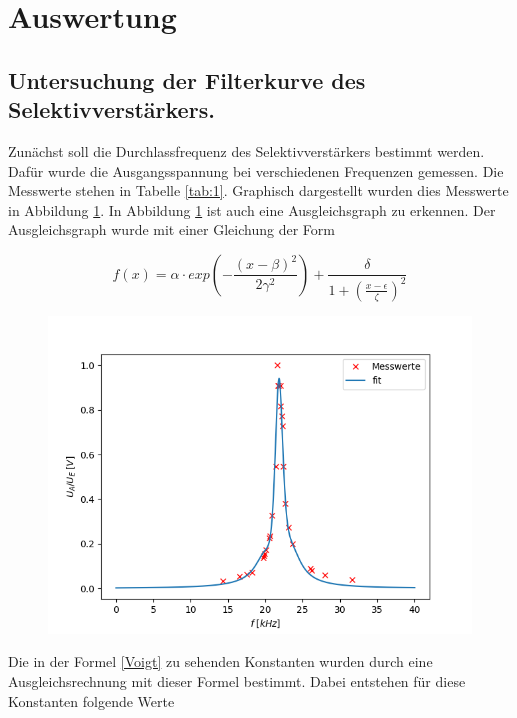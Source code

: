 \section{Auswertung}

\subsection{Untersuchung der Filterkurve des Selektivverstärkers.}

Zunächst soll die Durchlassfrequenz des Selektivverstärkers bestimmt werden. Dafür wurde die Ausgangsspannung bei verschiedenen Frequenzen gemessen. Die Messwerte stehen in Tabelle \ref{tab:1}. Graphisch dargestellt wurden dies Messwerte in Abbildung \ref{fig:durchlass}. In Abbildung \ref{fig:durchlass} ist auch eine Ausgleichsgraph zu erkennen. Der Ausgleichsgraph wurde mit einer Gleichung der Form

\begin{equation} \label{Voigt}
    f(x) = \alpha \cdot exp \left( - \frac{(x-\beta)^2}{2\gamma^2} \right) + \frac{\delta}{1+\left(\frac{x-\epsilon}{\zeta}\right)^2}
\end{equation}

\begin{figure}
    \centering
    \includegraphics{durchlass.png}
    \label{fig:durchlass}
\end{figure}

\noindent Die in der Formel \ref{Voigt} zu sehenden Konstanten wurden durch eine Ausgleichsrechnung mit dieser Formel bestimmt. Dabei entstehen für diese Konstanten folgende Werte

